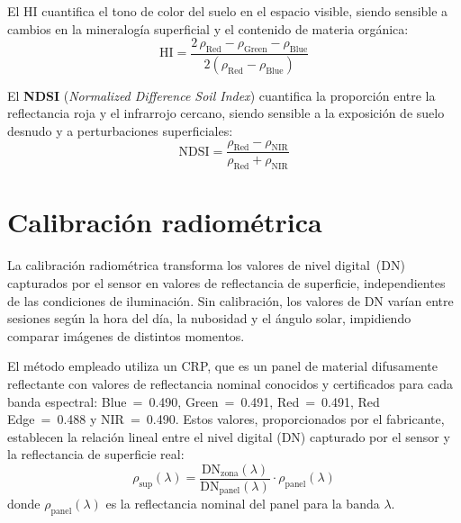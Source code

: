 El \ac{HI} cuantifica el tono de color del suelo en el espacio visible,
siendo sensible a cambios en la mineralogía superficial y el contenido de
materia orgánica:
\begin{equation}
  \text{HI} = \frac{2\,\rho_{\text{Red}} - \rho_{\text{Green}} - \rho_{\text{Blue}}}
                   {2(\rho_{\text{Red}} - \rho_{\text{Blue}})}
  \label{eq:hi}
\end{equation}

El \textbf{NDSI} (\textit{Normalized Difference Soil Index}) cuantifica la
proporción entre la reflectancia roja y el infrarrojo cercano, siendo
sensible a la exposición de suelo desnudo y a perturbaciones superficiales:
\begin{equation}
  \text{NDSI} = \frac{\rho_{\text{Red}} - \rho_{\text{NIR}}}
                     {\rho_{\text{Red}} + \rho_{\text{NIR}}}
  \label{eq:ndsi}
\end{equation}

\section{Calibración radiométrica}
\label{sec:calibracion_teorica}

La calibración radiométrica transforma los valores de nivel digital~(DN)
capturados por el sensor en valores de reflectancia de superficie,
independientes de las condiciones de iluminación. Sin calibración, los
valores de DN varían entre sesiones según la hora del día, la nubosidad
y el ángulo solar, impidiendo comparar imágenes de distintos momentos.

El método empleado utiliza un \ac{CRP}, que es un panel de material
difusamente reflectante con valores de reflectancia nominal conocidos y
certificados para cada banda espectral: Blue~=~0.490, Green~=~0.491,
Red~=~0.491, Red Edge~=~0.488 y NIR~=~0.490. Estos valores, proporcionados
por el fabricante, establecen la relación lineal entre el nivel digital
(DN) capturado por el sensor y la reflectancia de superficie real:
\begin{equation}
  \rho_{\text{sup}}(\lambda) =
  \frac{\text{DN}_{\text{zona}}(\lambda)}{\text{DN}_{\text{panel}}(\lambda)}
  \cdot \rho_{\text{panel}}(\lambda)
  \label{eq:calibracion}
\end{equation}
\noindent donde $\rho_{\text{panel}}(\lambda)$ es la reflectancia nominal
del panel para la banda $\lambda$.

